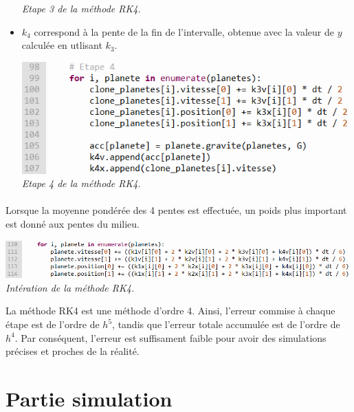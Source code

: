 \documentclass{article}
\begin{document}
\begin{itemize}
\begin{center}
                    \emph{Etape 3 de la méthode RK4.}
                \end{center}
                \item $k_4$ correspond à la pente de la fin de l'intervalle, obtenue avec la valeur de $y$ calculée en utlisant $k_3$.
                \begin{center}
                    \includegraphics[scale=0.5]{RK4partie4.png} \\
                    \emph{Etape 4 de la méthode RK4.}
                \end{center}
            \end{itemize}

            \paragraph{}

            Lorsque la moyenne pondérée des 4 pentes est effectuée, un poids plus important est donné aux pentes du milieu.

             \begin{center}
                    \includegraphics[scale=0.5]{RK4partiefin.png} \\
                    \emph{Intération de la méthode RK4.}
                \end{center}

            La méthode RK4 est une méthode d'ordre 4. Ainsi, l'erreur commise à chaque étape est de l'ordre de $h^5$, tandis que l'erreur totale accumulée est de l'ordre de $h^4$. Par conséquent, l'erreur est suffisament faible pour avoir des simulations précises et proches de la réalité.

\section{Partie simulation}
\end{document}
